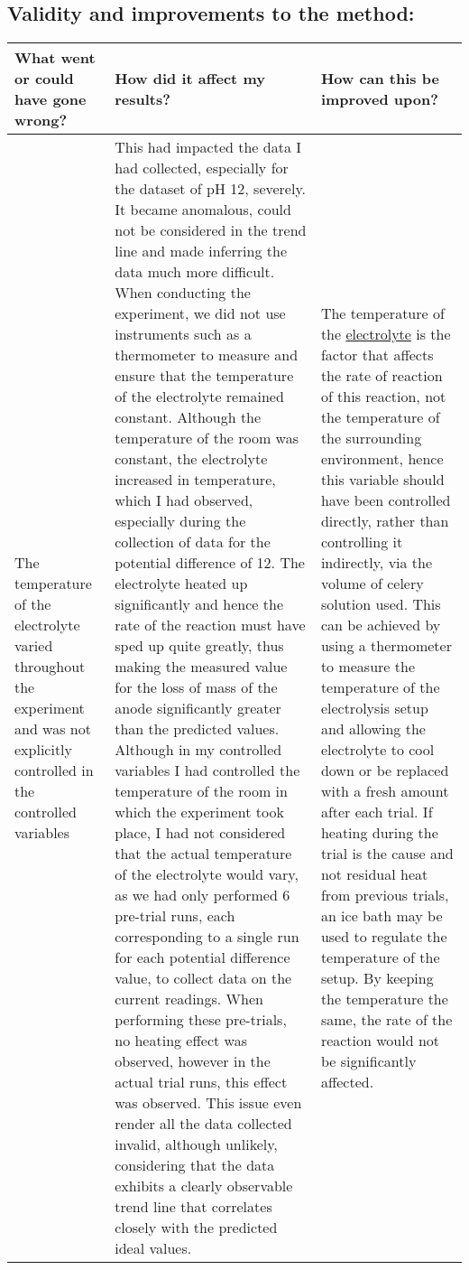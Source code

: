 \documentclass[11pt, a4]{article}
\begin{document}
		\subsection{Validity and improvements to the method:}
			\begin{small}
				\begin{longtable}{|m{3.5cm}|m{7cm}|m{4.7cm}|}
					
					\hline
					
					\textbf{What went or could have gone wrong?} & \textbf{How did it affect my results?} & \textbf{How can this be improved upon?}\\
					
					\hline
					\hline
					
					The temperature of the electrolyte varied throughout the experiment and was not explicitly controlled in the controlled variables & 
					This had impacted the data I had collected, especially for the dataset of pH 12, severely. It became anomalous, could not be considered in the trend line and made inferring the data much more difficult. When conducting the experiment, we did not use instruments such as a thermometer to measure and ensure that the temperature of the electrolyte remained constant. Although the temperature of the room was constant, the electrolyte increased in temperature, which I had observed, especially during the collection of data for the potential difference of 12. The electrolyte heated up significantly and hence the rate of the reaction must have sped up quite greatly, thus making the measured value for the loss of mass of the anode significantly greater than the predicted values. Although in my controlled variables I had controlled the temperature of the room in which the experiment took place, I had not considered that the actual temperature of the electrolyte would vary, as we had only performed 6 pre-trial runs, each corresponding to a single run for each potential difference value, to collect data on the current readings. When performing these pre-trials, no heating effect was observed, however in the actual trial runs, this effect was observed. This issue even render all the data collected invalid, although unlikely, considering that the data exhibits a clearly observable trend line that correlates closely with the predicted ideal values. &
					The temperature of the \underline{electrolyte} is the factor that affects the rate of reaction of this reaction, not the temperature of the surrounding environment, hence this variable should have been controlled directly, rather than controlling it indirectly, via the volume of celery solution used. This can be achieved by using a thermometer to measure the temperature of the electrolysis setup and allowing the electrolyte to cool down or be replaced with a fresh amount after each trial. If heating during the trial is the cause and not residual heat from previous trials, an ice bath may be used to regulate the temperature of the setup. By keeping the temperature the same, the rate of the reaction would not be significantly affected.\\
					

\end{longtable}
\end{small}
\end{document}
